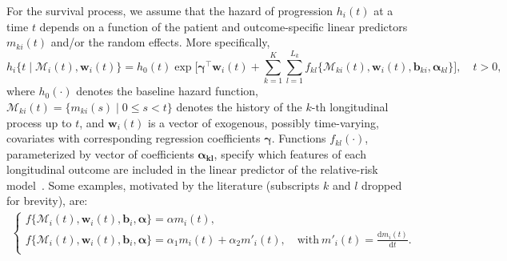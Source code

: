For the survival process, we assume that the hazard of progression $h_i(t)$ at a time $t$ depends on a function of the patient and outcome-specific linear predictors $m_{ki}(t)$ and/or the random effects. More specifically,
\begin{equation}
\label{eq:rel_risk_model}
h_i\big\{t \mid \mathcal{M}_i(t), \boldsymbol{w}_i(t)\big\} = h_0(t) \exp\Big[\boldsymbol{\gamma}^{\top}\boldsymbol{w}_i(t) + \sum_{k=1}^{K} \sum_{l=1}^{L_k} f_{kl} \big\{ \mathcal{M}_{ki}(t), \boldsymbol{w}_i(t), \boldsymbol{b}_{ki}, \boldsymbol{\alpha}_{kl} \big\}\Big], \quad t>0,
\end{equation}
where $h_0(\cdot)$ denotes the baseline hazard function, $\mathcal{M}_{ki}(t)=\{m_{ki}(s) \mid 0 \leq s < t \}$ denotes the history of the ${k\mbox{-th}}$ longitudinal process up to $t$, and $\boldsymbol{w}_i(t)$ is a vector of exogenous, possibly time-varying, covariates with corresponding regression coefficients $\boldsymbol{\gamma}$. Functions $f_{kl}(\cdot)$, parameterized by vector of coefficients $\boldsymbol{\alpha_{kl}}$, specify which features of each longitudinal outcome are included in the linear predictor of the relative-risk model~\citep{brown2009assessing,rizopoulos2012joint,taylor2013real}. Some examples, motivated by the literature (subscripts $k$ and $l$ dropped for brevity), are:
\begin{eqnarray*}
\left \{
\begin{array}{l}
f\big\{\mathcal{M}_{i}(t), \boldsymbol{w}_i(t), \boldsymbol{b}_{i}, \boldsymbol{\alpha} \big\} = \alpha m_{i}(t),\\
f\big\{ \mathcal{M}_{i}(t), \boldsymbol{w}_i(t), \boldsymbol{b}_{i}, \boldsymbol{\alpha}\big\} = \alpha_1 m_{i}(t) + \alpha_2 m'_{i}(t),\quad \text{with}\  m'_{i}(t) = \frac{\mathrm{d}{m_{i}(t)}}{\mathrm{d}{t}}.\\
\end{array}
\right.
\end{eqnarray*}
